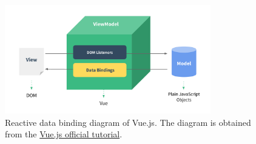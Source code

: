 \begin{figure}[!htb]
\centering
\includegraphics[width=0.8\textwidth]{images/vuejs_mvvm}
\caption[Reactive data binding diagram of Vue.js]{
    Reactive data binding diagram of Vue.js. The diagram is obtained from the
    \href{https://vuejs.org/guide/overview.html}{Vue.js official tutorial}.
}
\label{fig:vuejs-mvvm}
\end{figure}


